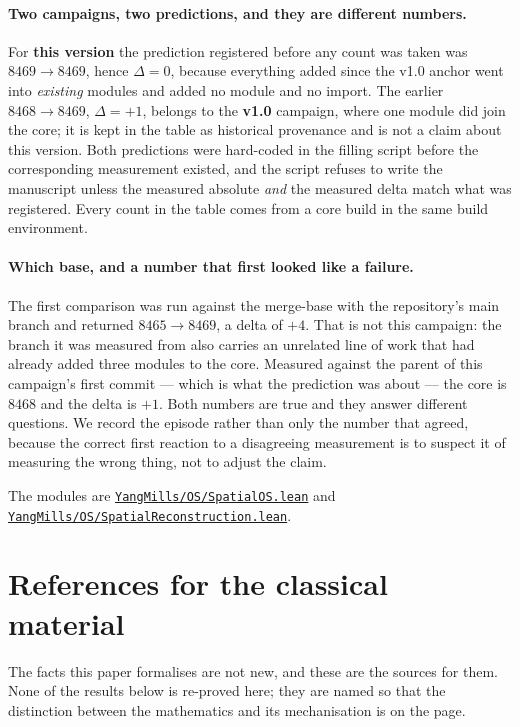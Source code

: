 \documentclass[11pt]{article}
\theoremstyle{definition}
\newcommand{\anchor}{c90dc745ab8cd1ba7ddc02aa16fed3de339bf958}
\newcommand{\repofile}[2]{%
  \href{https://github.com/lluiseriksson/THE-ERIKSSON-PROGRAMME/blob/\anchor/#1}{\nolinkurl{#2}}}
\begin{document}
\paragraph{Two campaigns, two predictions, and they are different numbers.}  For
\textbf{this version} the prediction registered before any count was taken was
$8469\to8469$, hence $\Delta=0$, because everything added since the v1.0 anchor
went into \emph{existing} modules and added no module and no import.  The
earlier $8468\to8469$, $\Delta=+1$, belongs to the \textbf{v1.0} campaign, where
one module did join the core; it is kept in the table as historical provenance
and is not a claim about this version.  Both predictions were hard-coded in the
filling script before the corresponding measurement existed, and the script
refuses to write the manuscript unless the measured absolute \emph{and} the
measured delta match what was registered.  Every count in the table comes from a
core build in the same build environment.

\paragraph{Which base, and a number that first looked like a failure.}  The
first comparison was run against the merge-base with the repository's main
branch and returned $8465\to8469$, a delta of $+4$.  That is not this campaign:
the branch it was measured from also carries an unrelated line of work that had
already added three modules to the core.  Measured against the parent of this
campaign's first commit --- which is what the prediction was about --- the core
is $8468$ and the delta is $+1$.  Both numbers are true and they answer
different questions.  We record the episode rather than only the number that
agreed, because the correct first reaction to a disagreeing measurement is to
suspect it of measuring the wrong thing, not to adjust the claim.

The modules are
\repofile{YangMills/OS/SpatialOS.lean}{YangMills/OS/SpatialOS.lean} and
\repofile{YangMills/OS/SpatialReconstruction.lean}{YangMills/OS/SpatialReconstruction.lean}.

\section*{References for the classical material}

The facts this paper formalises are not new, and these are the sources for them.
None of the results below is re-proved here; they are named so that the
distinction between the mathematics and its mechanisation is on the page.
\end{document}
